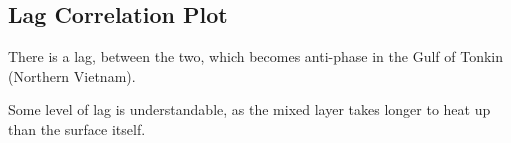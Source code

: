 



\subsection{Lag Correlation Plot}
\label{sec:lag}

There is a lag, between the two, which becomes anti-phase in the Gulf
of Tonkin (Northern Vietnam).

Some level of lag is understandable, as the mixed layer takes longer
to heat up than the surface itself.


